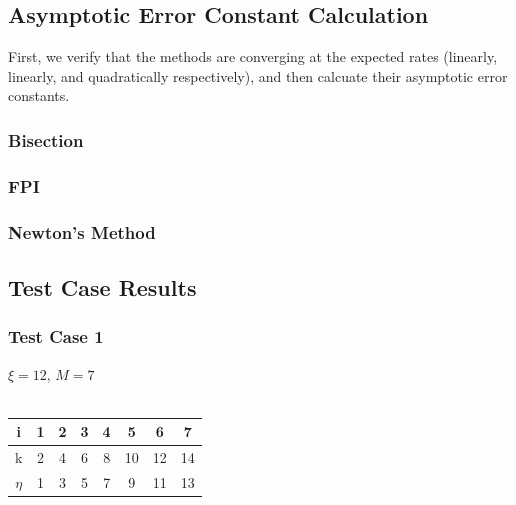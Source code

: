 \documentclass[11pt]{article} %
\begin{document}
\subsection*{Asymptotic Error Constant Calculation}
First, we verify that the methods are converging at the expected rates (linearly, linearly, and quadratically respectively), and then calcuate their asymptotic error constants.

\subsubsection*{Bisection}
\subsubsection*{FPI}
\subsubsection*{Newton's Method}

\subsection*{Test Case Results}
\subsubsection*{Test Case 1}
$\xi = 12$, $M = 7$ \\ \\
\begin{tabular}{||c||c c c c c c c|}
\hline
i & 1 & 2 & 3 & 4 & 5 & 6 & 7 \\
\hline
k & 2 & 4 & 6 & 8 & 10 & 12 & 14 \\
\hline
$\eta$ & 1 & 3 & 5 & 7 & 9 & 11 & 13 \\
\hline
\end{tabular}
\end{document}
